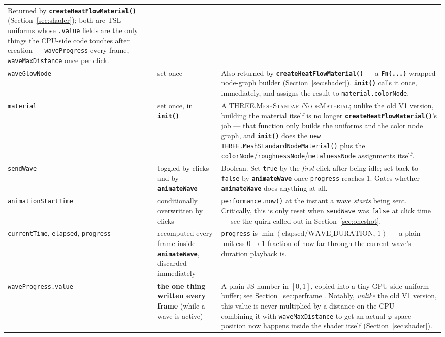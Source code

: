 \documentclass[11pt]{article}
\newcommand{\code}[1]{\texttt{#1}}
\newcommand{\func}[1]{\texttt{\textbf{#1}}}
\newcommand{\type}[1]{\textsc{#1}}
\begin{document}
\begin{center}
\begin{tabular}{@{}p{2.6cm}p{2.6cm}p{9cm}@{}}
  Returned by \func{createHeatFlowMaterial()} (Section~\ref{sec:shader}); both are TSL
  uniforms whose \code{.value} fields are the only things the CPU-side code touches after
  creation --- \code{waveProgress} every frame, \code{waveMaxDistance} once per click. \\
\code{waveGlowNode} & set once & Also returned by \func{createHeatFlowMaterial()} --- a
  \func{Fn(...)}-wrapped node-graph builder (Section~\ref{sec:shader}). \func{init()} calls
  it once, immediately, and assigns the result to \code{material.colorNode}. \\
\code{material} & set once, in \func{init()} & A \type{THREE.MeshStandardNodeMaterial};
  unlike the old V1 version, building the material itself is no longer
  \func{createHeatFlowMaterial()}'s job --- that function only builds the uniforms and the
  color node graph, and \func{init()} does the \code{new THREE.MeshStandardNodeMaterial()}
  plus the \code{colorNode}/\code{roughnessNode}/\code{metalnessNode} assignments itself. \\
\midrule
\code{sendWave} & toggled by clicks and by \func{animateWave} & Boolean. Set \code{true} by
  the \emph{first} click after being idle; set back to \code{false} by
  \func{animateWave} once \code{progress} reaches $1$. Gates whether
  \func{animateWave} does anything at all. \\
\code{animationStartTime} & conditionally overwritten by clicks & \code{performance.now()}
  at the instant a wave \emph{starts} being sent. Critically, this is only reset when
  \code{sendWave} was \code{false} at click time --- see the quirk called out in
  Section~\ref{sec:oneshot}. \\
\midrule
\code{currentTime}, \code{elapsed}, \code{progress} & recomputed every frame inside
  \func{animateWave}, discarded immediately & \code{progress} is
  $\min(\text{elapsed}/\text{WAVE\_DURATION},\,1)$ --- a plain unitless $0\to1$ fraction of
  how far through the current wave's duration playback is. \\
\code{waveProgress.value} & \textbf{the one thing written every frame} (while a wave is
  active) & A plain JS number in $[0,1]$, copied into a tiny GPU-side uniform buffer; see
  Section~\ref{sec:perframe}. Notably, \emph{unlike} the old V1 version, this value is never
  multiplied by a distance on the CPU --- combining it with \code{waveMaxDistance} to get an
  actual $\varphi$-space position now happens inside the shader itself
  (Section~\ref{sec:shader}). \\
\bottomrule
\end{tabular}
\end{center}
\end{document}
